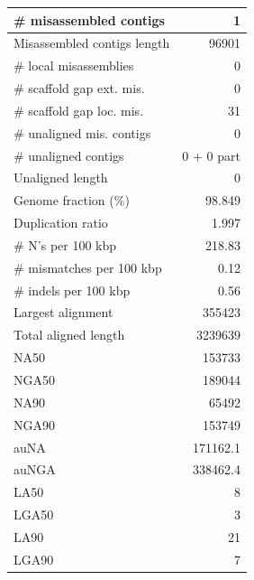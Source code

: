 \documentclass[12pt,a4paper]{article}
\begin{document}
\begin{table}[ht]
\begin{center}
\begin{tabular}{|l*{1}{|r}|}
\# misassembled contigs & 1 \\ \hline
Misassembled contigs length & 96901 \\ \hline
\# local misassemblies & 0 \\ \hline
\# scaffold gap ext. mis. & 0 \\ \hline
\# scaffold gap loc. mis. & 31 \\ \hline
\# unaligned mis. contigs & 0 \\ \hline
\# unaligned contigs & 0 + 0 part \\ \hline
Unaligned length & 0 \\ \hline
Genome fraction (\%) & 98.849 \\ \hline
Duplication ratio & 1.997 \\ \hline
\# N's per 100 kbp & 218.83 \\ \hline
\# mismatches per 100 kbp & 0.12 \\ \hline
\# indels per 100 kbp & 0.56 \\ \hline
Largest alignment & 355423 \\ \hline
Total aligned length & 3239639 \\ \hline
NA50 & 153733 \\ \hline
NGA50 & 189044 \\ \hline
NA90 & 65492 \\ \hline
NGA90 & 153749 \\ \hline
auNA & 171162.1 \\ \hline
auNGA & 338462.4 \\ \hline
LA50 & 8 \\ \hline
LGA50 & 3 \\ \hline
LA90 & 21 \\ \hline
LGA90 & 7 \\ \hline
\end{tabular}
\end{center}
\end{table}
\end{document}
